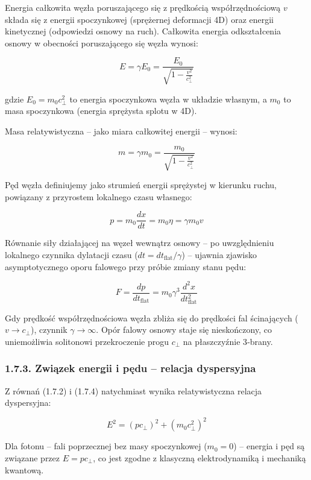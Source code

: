 \documentclass[
  letterpaper,
  DIV=11,
  numbers=noendperiod]{scrartcl}
\numberwithin{equation}{subsection}
\begin{document}
Energia całkowita węzła poruszającego się z prędkością współrzędnościową
\(v\) składa się z energii spoczynkowej (sprężernej deformacji 4D) oraz
energii kinetycznej (odpowiedzi osnowy na ruch). Całkowita energia
odkształcenia osnowy w obecności poruszającego się węzła wynosi:

\[E = \gamma E_0 = \frac{E_0}{\sqrt{1 - \frac{v^2}{c_{\perp}^2}}} \tag{1.7.2}\]

gdzie \(E_0 = m_0 c_{\perp}^2\) to energia spoczynkowa węzła w układzie
własnym, a \(m_0\) to masa spoczynkowa (energia sprężysta splotu w 4D).

Masa relatywistyczna -- jako miara całkowitej energii -- wynosi:

\[m = \gamma m_0 = \frac{m_0}{\sqrt{1 - \frac{v^2}{c_{\perp}^2}}} \tag{1.7.3}\]

Pęd węzła definiujemy jako strumień energii sprężystej w kierunku ruchu,
powiązany z przyrostem lokalnego czasu własnego:

\[p = m_0 \frac{dx}{dt} = m_0 \eta = \gamma m_0 v \tag{1.7.4}\]

Równanie siły działającej na węzeł wewnątrz osnowy -- po uwzględnieniu
lokalnego czynnika dylatacji czasu (\(dt = dt_{\text{flat}}/\gamma\)) --
ujawnia zjawisko asymptotycznego oporu falowego przy próbie zmiany stanu
pędu:

\[F = \frac{dp}{dt_{\text{flat}}} = m_0 \gamma^3 \frac{d^2 x}{dt_{\text{flat}}^2} \tag{1.7.5}\]

Gdy prędkość współrzędnościowa węzła zbliża się do prędkości fal
ścinających (\(v \to c_{\perp}\)), czynnik \(\gamma \to \infty\). Opór
falowy osnowy staje się nieskończony, co uniemożliwia solitonowi
przekroczenie progu \(c_{\perp}\) na płaszczyźnie 3‑brany.

\subsubsection{1.7.3. Związek energii i pędu -- relacja
dyspersyjna}\label{zwiux105zek-energii-i-pux119du-relacja-dyspersyjna}

Z równań (1.7.2) i (1.7.4) natychmiast wynika relatywistyczna relacja
dyspersyjna:

\[E^2 = (pc_{\perp})^2 + (m_0 c_{\perp}^2)^2 \tag{1.7.6}\]

Dla fotonu -- fali poprzecznej bez masy spoczynkowej (\(m_0 = 0\)) --
energia i pęd są związane przez \(E = pc_{\perp}\), co jest zgodne z
klasyczną elektrodynamiką i mechaniką kwantową.
\end{document}

